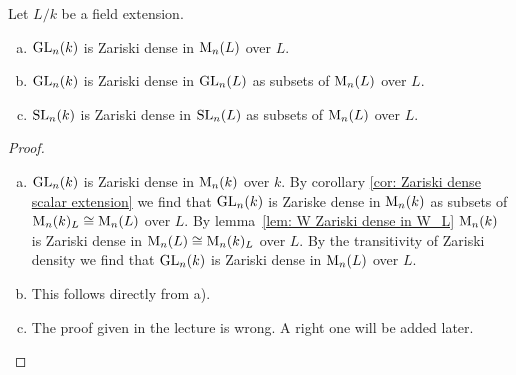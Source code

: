 \begin{prop}
 Let $L/k$ be a field extension.
 \begin{enumerate}[a)]
  \item
  $\operatorname{GL}_n(k)$ is Zariski dense in $\operatorname{M}_n(L)$ over $L$.
  \item
  $\operatorname{GL}_n(k)$ is Zariski dense in $\operatorname{GL}_n(L)$ as subsets of $\operatorname{M}_n(L)$ over $L$.
  \item
  $\operatorname{SL}_n(k)$ is Zariski dense in $\operatorname{SL}_n(L)$ as subsets of $\operatorname{M}_n(L)$ over $L$.
 \end{enumerate}
\end{prop}
\begin{proof}\leavevmode
 \begin{enumerate}[a)]
  \item
  $\operatorname{GL}_n(k)$ is Zariski dense in $\operatorname{M}_n(k)$ over $k$. By corollary \ref{cor: Zariski dense scalar extension} we find that $\operatorname{GL}_n(k)$ is Zariske dense in $\operatorname{M}_n(k)$ as subsets of $\operatorname{M}_n(k)_L \cong \operatorname{M}_n(L)$ over $L$. By \mbox{lemma \ref{lem: W Zariski dense in W_L}} $\operatorname{M}_n(k)$ is Zariski dense in $\operatorname{M}_n(L) \cong \operatorname{M}_n(k)_L$ over $L$. By the transitivity of Zariski density we find that $\operatorname{GL}_n(k)$ is Zariski dense in $\operatorname{M}_n(L)$ over $L$.
  \item
  This follows directly from a).
  \item
  The proof given in the lecture is wrong. A right one will be added later.
  \qedhere
 \end{enumerate}
\end{proof}


